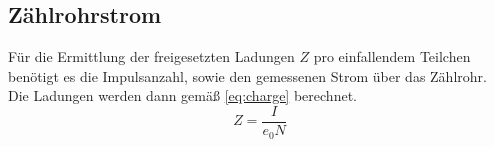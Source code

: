 \subsection{Zählrohrstrom}
Für die Ermittlung der freigesetzten Ladungen $Z$ pro einfallendem Teilchen benötigt es die Impulsanzahl, sowie den gemessenen Strom über das Zählrohr.
Die Ladungen werden dann gemäß \ref{eq:charge} berechnet.
\begin{equation}
    Z = \frac{I}{e_0N}
    \label{eq:charge}
\end{equation}